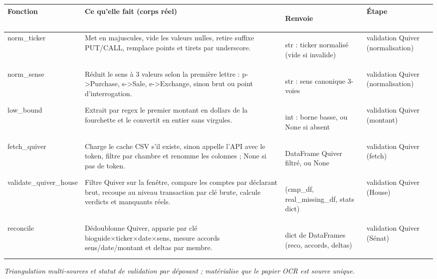 \documentclass[11pt,a4paper]{article}
\makeatletter
\newenvironment{fnt}{%
  \par\footnotesize
  \setlength{\tabcolsep}{3pt}%
  \begin{longtable}{@{}>{\ttfamily\scriptsize\raggedright\arraybackslash}p{3.0cm} >{\raggedright\arraybackslash}p{7.5cm} >{\itshape\scriptsize\raggedright\arraybackslash}p{2.7cm} >{\scriptsize\raggedright\arraybackslash}p{1.85cm}@{}}
  \toprule
  \normalfont\bfseries\scriptsize Fonction & \bfseries\scriptsize Ce qu'elle fait (corps réel) &
  \normalfont\bfseries\scriptsize Renvoie & \normalfont\bfseries\scriptsize Étape\\
  \midrule\endhead
}{\bottomrule\end{longtable}\par}
\newcommand{\fnmod}[2]{\par\smallskip\noindent{\ttfamily\bfseries #1}\;\textmd{\itshape\small\textemdash{} #2}\par\nobreak\vspace{2pt}}
\makeatother
\begin{document}
\begin{fnt}
norm_\allowbreak ticker & Met en majuscules,\allowbreak{} vide les valeurs nulles,\allowbreak{} retire suffixe PUT/\allowbreak{}CALL,\allowbreak{} remplace points et tirets par underscore. & str : ticker normalisé (vide si invalide)\allowbreak{} & validation Quiver (normalisation) \\
norm_\allowbreak sense & Réduit le sens à 3 valeurs selon la première lettre : p->Purchase,\allowbreak{} s->Sale,\allowbreak{} e->Exchange,\allowbreak{} sinon brut ou point d'interrogation. & str : sens canonique 3-voies & validation Quiver (normalisation) \\
low_\allowbreak bound & Extrait par regex le premier montant en dollars de la fourchette et le convertit en entier sans virgules. & int : borne basse,\allowbreak{} ou None si absent & validation Quiver (montant) \\
fetch_\allowbreak quiver & Charge le cache CSV s'il existe,\allowbreak{} sinon appelle l'API avec le token,\allowbreak{} filtre par chambre et renomme les colonnes ; None si pas de token. & DataFrame Quiver filtré,\allowbreak{} ou None & validation Quiver (fetch) \\
validate_\allowbreak quiver_\allowbreak house & Filtre Quiver sur la fenêtre,\allowbreak{} compare les comptes par déclarant brut,\allowbreak{} recoupe au niveau transaction par clé brute,\allowbreak{} calcule verdicts et manquants réels. & (cmp_df,\allowbreak{} real_missing_df,\allowbreak{} stats dict)\allowbreak{} & validation Quiver (House) \\
reconcile & Dédoublonne Quiver,\allowbreak{} apparie par clé bioguide×ticker×date×sens,\allowbreak{} mesure accords sens/\allowbreak{}date/\allowbreak{}montant et deltas par membre. & dict de DataFrames (reco,\allowbreak{} accords,\allowbreak{} deltas)\allowbreak{} & validation Quiver (Sénat) \\
\end{fnt}
\fnmod{crosscheck.py}{Triangulation multi-sources et statut de validation par déposant ; matérialise que le papier OCR est source unique.}
\end{document}
